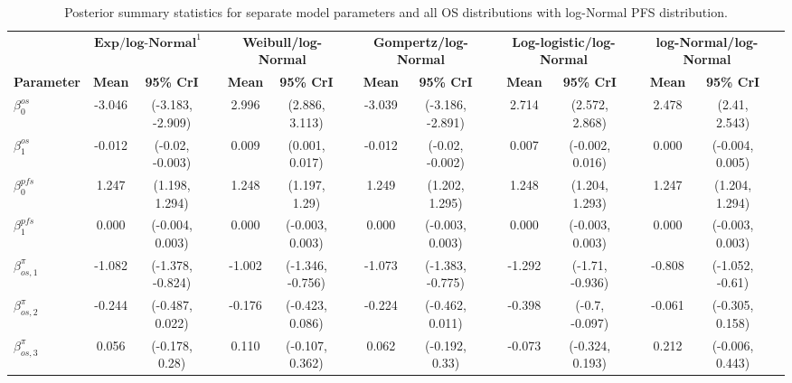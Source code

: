 \documentclass[AMA,STIX1COL]{WileyNJD-v2}
\begin{document}
\begin{landscape}
\begin{center}
\begin{table}[t]
\caption{Posterior summary statistics for separate model parameters and all OS distributions with log-Normal PFS distribution. \label{tab:post_sep_pfs_lnormal}}
\centering
\begin{tabular}{l c c c c c c c c c c c c c c c}
\toprule
\multicolumn{1}{l}{} & \multicolumn{2}{c}{$\textbf{Exp/log-Normal}^1$} & & \multicolumn{2}{c}{\textbf{Weibull/log-Normal}} & & \multicolumn{2}{c}{\textbf{Gompertz/log-Normal}} & & \multicolumn{2}{c}{\textbf{Log-logistic/log-Normal}} & & \multicolumn{2}{c}{\textbf{log-Normal/log-Normal}}\\
\cmidrule{2-3}\cmidrule{5-6}\cmidrule{8-9}\cmidrule{11-12}\cmidrule{14-15}
\textbf{Parameter} & \textbf{Mean} & \textbf{95\% CrI} & & \textbf{Mean} & \textbf{95\% CrI} & & \textbf{Mean} & \textbf{95\% CrI} & & \textbf{Mean} & \textbf{95\% CrI} & & \textbf{Mean} & \textbf{95\% CrI}\\
\midrule
$\beta^{os}_0$ & -3.046 & (-3.183, -2.909) &  & 2.996 & (2.886, 3.113) &  & -3.039 & (-3.186, -2.891) &  & 2.714 & (2.572, 2.868) &  & 2.478 & (2.41, 2.543) & \\
$\beta^{os}_1$ & -0.012 & (-0.02, -0.003) &  & 0.009 & (0.001, 0.017) &  & -0.012 & (-0.02, -0.002) &  & 0.007 & (-0.002, 0.016) &  & 0.000 & (-0.004, 0.005) & \\
$\beta^{pfs}_0$ & 1.247 & (1.198, 1.294) &  & 1.248 & (1.197, 1.29) &  & 1.249 & (1.202, 1.295) &  & 1.248 & (1.204, 1.293) &  & 1.247 & (1.204, 1.294) & \\
$\beta^{pfs}_1$ & 0.000 & (-0.004, 0.003) &  & 0.000 & (-0.003, 0.003) &  & 0.000 & (-0.003, 0.003) &  & 0.000 & (-0.003, 0.003) &  & 0.000 & (-0.003, 0.003) & \\
$\beta^{\pi}_{os, 1}$ & -1.082 & (-1.378, -0.824) &  & -1.002 & (-1.346, -0.756) &  & -1.073 & (-1.383, -0.775) &  & -1.292 & (-1.71, -0.936) &  & -0.808 & (-1.052, -0.61) & \\
$\beta^{\pi}_{os, 2}$ & -0.244 & (-0.487, 0.022) &  & -0.176 & (-0.423, 0.086) &  & -0.224 & (-0.462, 0.011) &  & -0.398 & (-0.7, -0.097) &  & -0.061 & (-0.305, 0.158) & \\
$\beta^{\pi}_{os, 3}$ & 0.056 & (-0.178, 0.28) &  & 0.110 & (-0.107, 0.362) &  & 0.062 & (-0.192, 0.33) &  & -0.073 & (-0.324, 0.193) &  & 0.212 & (-0.006, 0.443) & \\

\end{tabular}
\end{table}
\end{center}
\end{landscape}
\end{document}
